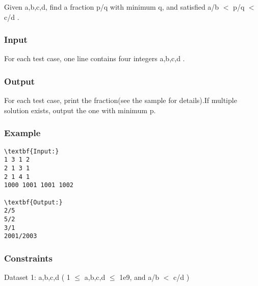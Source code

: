 







   Given a,b,c,d, find a fraction p/q with minimum q, and satisfied a/b $<$ p/q $<$ c/d .  

\subsubsection{   Input  }

   For each test case, one line contains four integers a,b,c,d .  

\subsubsection{   Output  }

   For each test case, print the fraction(see the sample for details).If multiple solution exists, output the one with minimum p.  

\subsubsection{   Example  }
\begin{verbatim}
\textbf{Input:}
1 3 1 2
2 1 3 1
2 1 4 1
1000 1001 1001 1002

\textbf{Output:}
2/5
5/2
3/1
2001/2003
\end{verbatim}

\subsubsection{   Constraints  }

   Dataset 1: a,b,c,d ( 1  $\le$  a,b,c,d  $\le$  1e9, and a/b $<$ c/d )  

